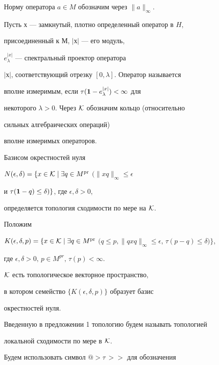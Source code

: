 Норму оператора $a\in M$ обозначим через $\| a\|_{\infty}$.


Пусть $х$ --- замкнутый, плотно определенный оператор в $H$,


присоединенный к $М$, $|х|$ --- его модуль,


$e_{\lambda}^{| x|}$ --- спектральный проектор оператора


$| х|$, соответствующий отрезку $[0,\lambda]$. Оператор называется


вполне измеримым, если $\tau({\bf 1}-e_{\lambda}^{| x|}) < \infty$ для


некоторого $\lambda > 0$. Через $\cal K$ обозначим кольцо (относительно


сильных алгебраических операций)


вполне измеримых операторов.


Базисом окрестностей нуля


$N(\epsilon,\delta) = \{ x\in {\cal K} \mid \exists q\in


M^{\pr}$ $(\| xq\|_{\infty}\le \epsilon$


и $\tau({\bf 1}-q)\le \delta) \}$, где $\epsilon,\delta >0$, 


определяется топология сходимости по мере на $\cal K$.


Положим


$K(\epsilon,\delta, p) = \{ x\in {\cal K} \mid \exists q\in


M^{\pr}$ $(q\le p, \| qxq\|_{\infty}


\le \epsilon$, $\tau(p-q)\le \delta )\}$,


где $\epsilon,\delta >0,\, p\in M^{pr},\, {\tau}(p)<{\infty}$.





\begin{prop}


${\cal K}$ есть топологическое векторное пространство,


в котором семейство $\{K(\epsilon,\delta,p)\}$ образует базис


окрестностей нуля.


\end{prop}





Введенную в предложении 1 топологию будем называть топологией


локальной сходимости по мере в ${\cal K}$.


Будем использовать символ $@>{\tau\,}>>$ для обозначения


